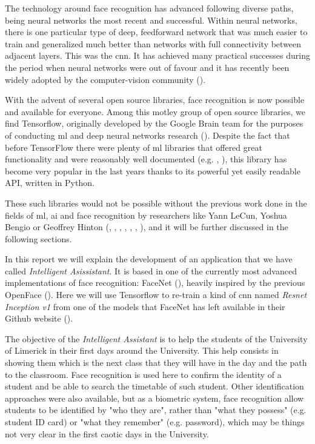 The technology around face recognition has advanced following diverse paths, being neural networks the most recent and successful. Within neural networks, there is one particular type of deep, feedforward network that was much easier to train and generalized much better than networks with full connectivity between adjacent layers. This was the \gls{cnn}. It has achieved many practical successes during the period when neural networks were out of favour and it has recently been widely adopted by the computer-vision community (\cite{lecun2015deep}). 

With the advent of several open source libraries, face recognition is now possible and available for everyone. Among this motley group of open source libraries, we find Tensorflow, originally developed by the Google Brain team for the purposes of conducting \gls{ml} and deep neural networks research (\cite{tensorflow_main_website}). Despite the fact that before TensorFlow there were plenty of \gls{ml} libraries that offered great functionality and were reasonably well documented (e.g. \cite{theano_main_site}, \cite{caffe_main_site}), this library has become very popular in the last years thanks to its powerful yet easily readable API, written in Python. 

\clearpage

These such libraries would not be possible without the previous work done in the fields of \gls{ml}, \gls{ai} and face recognition by researchers like Yann LeCun, Yoshua Bengio or Geoffrey Hinton (\cite{rumelhart1985learning}, \cite{lecun1995convolutional}, \cite{lecun1998efficient}, \cite{lecun1998gradient}, \cite{bengio2009learning}, \cite{krizhevsky2012deep}, \cite{lecun2015deep}), and it will be further discussed in the following sections.

In this report we will explain the development of an application that we have called \textit{Intelligent Asissistant}. It is based in one of the currently most advanced implementations of face recognition: FaceNet (\cite{facenet_article}), heavily inspired by the previous OpenFace (\cite{amos2016openface}). Here we will use Tensorflow to re-train a kind of \gls{cnn} named \textit{Resnet Inception v1} from one of the models that FaceNet has left available in their Github website (\cite{facenet_github}).

The objective of the \textit{Intelligent Assistant} is to help the students of the University of Limerick in their first days around the University. This help consists in showing them which is the next class that they will have in the day and the path to the classroom. Face recognition is used here to confirm the identity of a student and be able to search the timetable of such student. Other identification approaches were also available, but as a biometric system, face recognition allow students to be identified by "who they are", rather than "what they possess" (e.g. student ID card) or "what they remember" (e.g. password), which may be things not very clear in the first caotic days in the University. 


